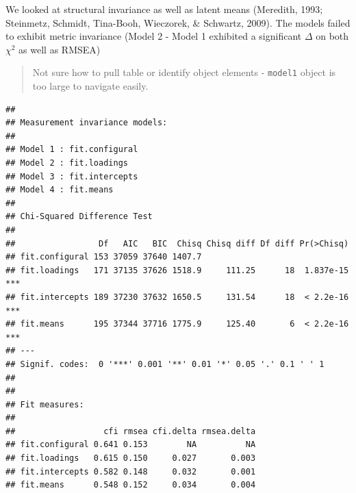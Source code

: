 \documentclass[
  english,
  man]{apa6}
\begin{document}
We looked at structural invariance as well as latent means (Meredith, 1993; Steinmetz, Schmidt, Tina-Booh, Wieczorek, \& Schwartz, 2009). The models failed to exhibit metric invariance (Model 2 - Model 1 exhibited a significant \(\Delta\) on both \(\chi^2\) as well as RMSEA)

\begin{quote}
Not sure how to pull table or identify object elements - \texttt{model1} object is too large to navigate easily.
\end{quote}

\begin{verbatim}
## 
## Measurement invariance models:
## 
## Model 1 : fit.configural
## Model 2 : fit.loadings
## Model 3 : fit.intercepts
## Model 4 : fit.means
## 
## Chi-Squared Difference Test
## 
##                 Df   AIC   BIC  Chisq Chisq diff Df diff Pr(>Chisq)    
## fit.configural 153 37059 37640 1407.7                                  
## fit.loadings   171 37135 37626 1518.9     111.25      18  1.837e-15 ***
## fit.intercepts 189 37230 37632 1650.5     131.54      18  < 2.2e-16 ***
## fit.means      195 37344 37716 1775.9     125.40       6  < 2.2e-16 ***
## ---
## Signif. codes:  0 '***' 0.001 '**' 0.01 '*' 0.05 '.' 0.1 ' ' 1
## 
## 
## Fit measures:
## 
##                  cfi rmsea cfi.delta rmsea.delta
## fit.configural 0.641 0.153        NA          NA
## fit.loadings   0.615 0.150     0.027       0.003
## fit.intercepts 0.582 0.148     0.032       0.001
## fit.means      0.548 0.152     0.034       0.004
\end{verbatim}
\end{document}
